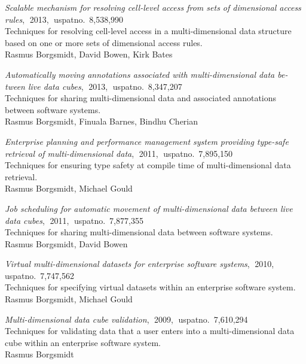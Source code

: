 \documentclass[a4paper,10pt,final]{memoir}
\DeclareRobustCommand{\spacedallcaps}[1]{\MakeTextUppercase{\allcapsspacing{#1}}}%
\newcommand{\Sep}{\vspace{1.5em}}
\newcommand{\SmallSep}{\vspace{0.5em}}
\newcommand{\MedSep}{\vspace{1em}}
\newcommand{\CVSection}[1]
	{\textbf{\spacedallcaps{#1}}\par
	\SmallSep\normalsize\normalfont}
\newcommand{\CVItem}[1]
	{\textit{\color{SpotColor} #1}}
\begin{document}
\Sep\CVSection{patents}

\CVItem{Scalable mechanism for resolving cell-level access from sets of
  dimensional access rules},$\;$ 2013,$\;$ uspatno.~8,538,990\\[3pt]
Techniques for resolving cell-level access in a multi-dimensional data structure
based on one or more sets of dimensional access rules.\\[3pt]
Rasmus Borgsmidt, David Bowen, Kirk Bates

\MedSep\CVItem{Automatically moving annotations associated with
  multi-dimensional data be-\linebreak tween live data cubes},$\;$ 2013,$\;$
uspatno.~8,347,207\\[3pt]
Techniques for sharing multi-dimensional data and associated annotations between
software systems.\\[3pt]
Rasmus Borgsmidt, Finuala Barnes, Bindhu Cherian

\MedSep\CVItem{Enterprise planning and performance management system
  providing type-safe retrieval of multi-dimensional data},$\;$ 2011,$\;$
uspatno.~7,895,150\\[3pt]
Techniques for ensuring type safety at compile time of multi-dimensional data
retrieval.\\[3pt]
Rasmus Borgsmidt, Michael Gould

\MedSep\CVItem{Job scheduling for automatic movement of
  multi-dimensional data between live data cubes},$\;$ 2011,$\;$
uspatno.~7,877,355\\[3pt]
Techniques for sharing multi-dimensional data between software systems.\\[3pt]
Rasmus Borgsmidt, David Bowen

\MedSep\CVItem{Virtual multi-dimensional datasets for enterprise
  software systems},$\;$ 2010,\\
uspatno.~7,747,562\\[3pt]
Techniques for specifying virtual datasets within an enterprise
software system.\\[3pt]
Rasmus Borgsmidt, Michael Gould

\MedSep\CVItem{Multi-dimensional data cube validation},$\;$ 2009,$\;$
uspatno.~7,610,294\\[3pt]
Techniques for validating data that a user enters into a multi-dimensional data
cube within an enterprise software system.\\[3pt]
Rasmus Borgsmidt
\end{document}
